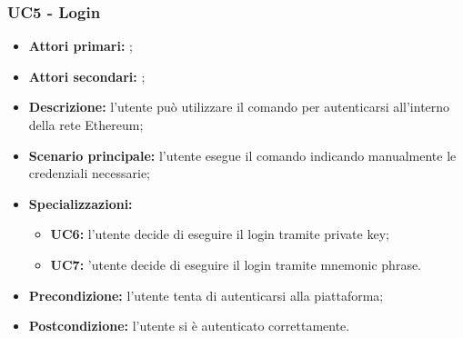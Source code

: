 \subsubsection{UC5 - Login}
\begin{itemize}
	\item \textbf{Attori primari:} \una{};
	\item \textbf{Attori secondari:} \re{};
	\item \textbf{Descrizione:} l’utente può utilizzare il comando \login{} per autenticarsi all’interno della rete Ethereum; 
	\item \textbf{Scenario principale:} l'utente esegue il comando \login{} indicando manualmente le credenziali necessarie; 
	\item \textbf{Specializzazioni:} 
	\begin{itemize}
		\item \textbf{UC6:} l’utente decide di eseguire il login tramite private key;
		\item \textbf{UC7:} ’utente decide di eseguire il login tramite mnemonic phrase.
	\end{itemize}
	\item \textbf{Precondizione:} l’utente tenta di autenticarsi alla piattaforma;
	\item \textbf{Postcondizione:} l’utente si è autenticato correttamente.
\end{itemize}